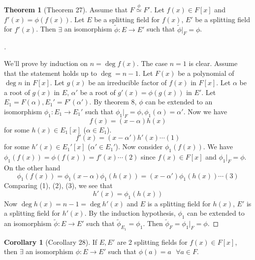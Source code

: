 \documentclass{article}
\newcommand{\sfa}{\text{  } \forall}
\theoremstyle{definition}
\newtheorem{thm}{Theorem}
\newtheorem{cor}{Corollary}
\newenvironment{proofs}[1][\proofname]{%
  \begin{proof}[#1]$ $\par\nobreak\ignorespaces
}{%
  \end{proof}
}
\begin{document}
\begin{thm}[Theorem 27]
	Assume that $F \stackrel{\phi}{\simeq} F'$.
	Let $f(x) \in F[x]$ and $f'(x) = \phi(f(x))$. 
	Let $E$ be a splitting field for $f(x)$, $E'$ be a splitting field for $f'(x)$.
	Then $\exists$ an isomorphism $\tilde{\phi}:E \to E'$ such that $\tilde{\phi}|_F = \phi$.
\end{thm}

\begin{proofs}
	We'll prove by induction on $n = \deg f(x)$.
	The case $n = 1$ is clear.
	Assume that the statement holds up to $\deg = n - 1$.
	Let $F(x)$ be a polynomial of $\deg n$ in $F[x]$.
	Let $g(x)$ be an irreducible factor of $f(x)$ in $F[x]$.
	Let $\alpha$ be a root of $g(x)$ in $E$, $\alpha'$ be a root of $g'(x) = \phi(g(x))$ in $E'$.
	Let $E_1 = F(\alpha), E_1' = F'(\alpha')$.
	By theorem 8, $\phi$ can be extended to an isomorphism $\phi_1: E_1 \to E_1'$ such that $\phi_1|_F = \phi, \phi_1(\alpha) = \alpha'$.
	Now we have
	\[
		f(x) = (x - \alpha) h(x)
	\]
	for some $h(x) \in E_1[x]$ ($\alpha \in E_1$).
	\[
		f'(x) = (x - \alpha') h'(x) \cdots (1)
	\]
	for some $h'(x) \in E_1'[x]$ ($\alpha' \in E_1'$).
	Now consider $\phi_1(f(x))$.
	We have $\phi_1(f(x)) = \phi(f(x)) = f'(x) \cdots (2)$ since $f(x) \in F[x]$ and $\phi_1|_F = \phi$.
	On the other hand
	\[
		\phi_1(f(x)) = \phi_1(x - \alpha) \phi_1(h(x)) = (x - \alpha') \phi_1(h(x)) \cdots (3)
	\]
	Comparing (1), (2), (3), we see that 
	\[
		h'(x) = \phi_1(h(x))
	\]
	Now $\deg h(x) = n - 1 = \deg h'(x)$ and $E$ is a splitting field for $h(x)$, $E'$ is a splitting field for $h'(x)$.
	By the induction hypothesis, $\phi_1$ can be extended to an isomorphism $\tilde{\phi}: E \to E'$ such that $\tilde{\phi}_{E_1} = \phi_1$.
	Then $\tilde{\phi}_F = \phi_1|_F = \phi$.
\end{proofs}

\begin{cor}[Corollary 28]
	If $E, E'$ are 2 splitting fields for $f(x) \in F[x]$, then $\exists$ an isomorphism $\phi: E \to E'$ such that $\phi(a) = a \sfa a \in F$.
\end{cor}
\end{document}
